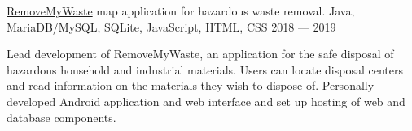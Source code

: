 \showoff
{\textcolor{my-blue}{\href{https://removemywaste.liambeckman.com/}{RemoveMyWaste}}}
{map application for hazardous waste removal.}
{Java, MariaDB/MySQL, SQLite, JavaScript, HTML, CSS}
{2018 --- 2019}

Lead development of RemoveMyWaste, an application for the safe disposal of hazardous household and industrial materials. Users can locate disposal centers and read information on the materials they wish to dispose of. Personally developed Android application and web interface and set up hosting of web and database components.

